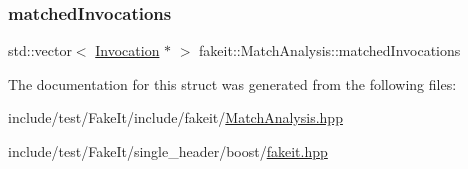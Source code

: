\mbox{\label{structfakeit_1_1MatchAnalysis_a838cec9bbcb5e5e9fbe12f9fe6e9dd8e}} 
\subsubsection{\texorpdfstring{matchedInvocations}{matchedInvocations}}
{\footnotesize\ttfamily std\+::vector$<$ \mbox{\hyperlink{structfakeit_1_1Invocation}{Invocation}} $\ast$ $>$ fakeit\+::\+Match\+Analysis\+::matched\+Invocations}



The documentation for this struct was generated from the following files\+:\begin{DoxyCompactItemize}
\item 
include/test/\+Fake\+It/include/fakeit/\mbox{\hyperlink{MatchAnalysis_8hpp}{Match\+Analysis.\+hpp}}\item 
include/test/\+Fake\+It/single\+\_\+header/boost/\mbox{\hyperlink{single__header_2boost_2fakeit_8hpp}{fakeit.\+hpp}}\end{DoxyCompactItemize}
